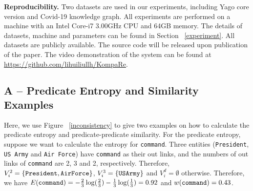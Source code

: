 



\noindent \textbf{Reproducibility.} Two datasets are used in our experiments, including Yago core version and Covid-19 knowledge graph. All experiments are performed on a machine with an Intel Core-i7 3.00GHz CPU and 64GB memory. The details of datasets, machine and parameters can be found in Section ~\ref{experiment}. All datasets are publicly available. The source code will be released upon publication of the paper. The video demonstration of the system can be found at
\url{https://github.com/lihuiliullh/KompaRe}.


\vspace{-0.3\baselineskip}
\subsection{A -- Predicate Entropy and Similarity Examples}
\vspace{-0.3\baselineskip}
Here, we use Figure ~\ref{inconsistency} to give two examples on how to calculate the predicate entropy and predicate-predicate similarity. 
For the predicate entropy, 
suppose we want to calculate the entropy for {\tt command}. Three entities ({\tt President}, {\tt US Army} and {\tt Air Force}) have {\tt command} as their out links, and the numbers of out links of {\tt command} are 2, 3 and 2, respectively. 
Therefore, 
$V_i^2 = \{{\tt President}, {\tt Air Force} \}$, $V_i^3 = \{ {\tt US Army} \}$ and $V_i^d = \emptyset$ otherwise. Therefore, we have 
$E({\tt command}) = -\frac{2}{3} \log(\frac{2}{3}) - \frac{1}{3}\log(\frac{1}{3}) = 0.92$ and $w({\tt command}) = 0.43$.



